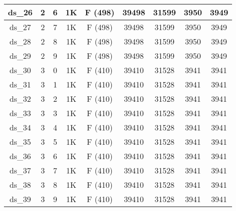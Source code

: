 \begin{footnotesize}
\begin{longtable}{|c|c|c|c|c|c|c|c|c|}
ds\_26      & 2           & 6           & 1K        & F (498)                     & 39498         & 31599          & 3950           & 3949          \\ \hline
ds\_27      & 2           & 7           & 1K        & F (498)                     & 39498         & 31599          & 3950           & 3949          \\ \hline
ds\_28      & 2           & 8           & 1K        & F (498)                     & 39498         & 31599          & 3950           & 3949          \\ \hline
ds\_29      & 2           & 9           & 1K        & F (498)                     & 39498         & 31599          & 3950           & 3949          \\ \hline
ds\_30      & 3           & 0           & 1K        & F (410)                     & 39410         & 31528          & 3941           & 3941          \\ \hline
ds\_31      & 3           & 1           & 1K        & F (410)                     & 39410         & 31528          & 3941           & 3941          \\ \hline
ds\_32      & 3           & 2           & 1K        & F (410)                     & 39410         & 31528          & 3941           & 3941          \\ \hline
ds\_33      & 3           & 3           & 1K        & F (410)                     & 39410         & 31528          & 3941           & 3941          \\ \hline
ds\_34      & 3           & 4           & 1K        & F (410)                     & 39410         & 31528          & 3941           & 3941          \\ \hline
ds\_35      & 3           & 5           & 1K        & F (410)                     & 39410         & 31528          & 3941           & 3941          \\ \hline
ds\_36      & 3           & 6           & 1K        & F (410)                     & 39410         & 31528          & 3941           & 3941          \\ \hline
ds\_37      & 3           & 7           & 1K        & F (410)                     & 39410         & 31528          & 3941           & 3941          \\ \hline
ds\_38      & 3           & 8           & 1K        & F (410)                     & 39410         & 31528          & 3941           & 3941          \\ \hline
ds\_39      & 3           & 9           & 1K        & F (410)                     & 39410         & 31528          & 3941           & 3941          \\ \hline

\end{longtable}
\end{footnotesize}
